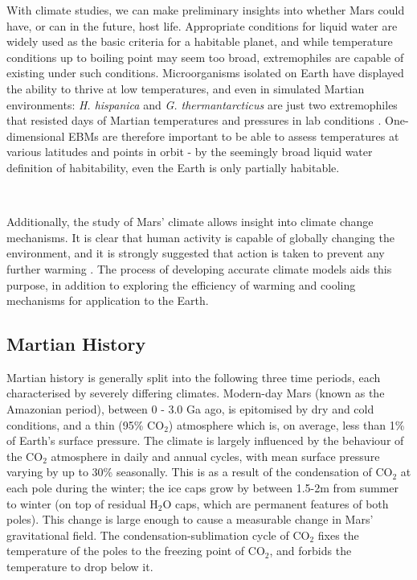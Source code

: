 \documentclass[12pt,onecolumn]{revtex4-2}    %
\begin{document}
With climate studies, we can make preliminary insights into whether Mars could have, or can in the future, host life. %
Appropriate conditions for liquid water are widely used as the basic criteria for a habitable planet, and while temperature conditions up to boiling point may seem too broad, extremophiles are capable of existing under such conditions. Microorganisms isolated on Earth have displayed the ability to thrive at low temperatures, and even in simulated Martian environments: \textit{H. hispanica} and \textit{G. thermantarcticus} are just two extremophiles that resisted days of Martian temperatures and pressures in lab conditions \cite{M14}. One-dimensional EBMs are therefore important to be able to assess temperatures at various latitudes and points in orbit - by the seemingly broad liquid water definition of habitability, even the Earth is only partially habitable.

\

Additionally, the study of Mars' climate allows insight into climate change mechanisms. It is clear that human activity is capable of globally changing the environment, and it is strongly suggested that action is taken to prevent any further warming \cite{IPCC23}. The process of developing accurate climate models aids this purpose, in addition to exploring the efficiency of warming and cooling mechanisms for application to the Earth.

\subsection{Martian History}

Martian history is generally split into the following three time periods, each characterised by severely differing climates. Modern-day Mars (known as the Amazonian period), between 0 - 3.0 Ga ago, is epitomised by dry and cold conditions, and a thin (95\% $\mathrm{CO_2}$) atmosphere which is, on average, less than 1\% of Earth's surface pressure. The climate is largely influenced by the behaviour of the $\mathrm{CO_2}$ atmosphere in daily and annual cycles, with mean surface pressure varying by up to 30\% seasonally. This is as a result of the condensation of $\mathrm{CO_2}$ at each pole during the winter; the ice caps grow by between 1.5-2m from summer to winter (on top of residual $\mathrm{H_2O}$ caps, which are permanent features of both poles). This change is large enough to cause a measurable change in Mars' gravitational field. The condensation-sublimation cycle of $\mathrm{CO_2}$ fixes the temperature of the poles to the freezing point of $\mathrm{CO_2}$, and forbids the temperature to drop below it.
\end{document}
